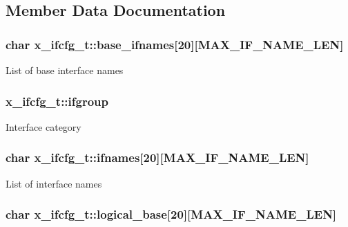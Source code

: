 \subsection{Member Data Documentation}
\hypertarget{structx__ifcfg__t_accff1ffe5db8d5f6d96b007b8bff2157}{
\subsubsection[{base\-\_\-ifnames}]{\setlength{\rightskip}{0pt plus 5cm}char x\-\_\-ifcfg\-\_\-t\-::base\-\_\-ifnames\mbox{[}20\mbox{]}\mbox{[}{\bf M\-A\-X\-\_\-\-I\-F\-\_\-\-N\-A\-M\-E\-\_\-\-L\-E\-N}\mbox{]}}}\label{structx__ifcfg__t_accff1ffe5db8d5f6d96b007b8bff2157}
List of base interface names \hypertarget{structx__ifcfg__t_a465fac74e7e1a3c4a255e7ad550c7fd2}{
\subsubsection[{ifgroup}]{ x\-\_\-ifcfg\-\_\-t\-::ifgroup}}\label{structx__ifcfg__t_a465fac74e7e1a3c4a255e7ad550c7fd2}
Interface category \hypertarget{structx__ifcfg__t_aac5a55bd377922f0fd0f56f6b0b4ab43}{
\subsubsection[{ifnames}]{\setlength{\rightskip}{0pt plus 5cm}char x\-\_\-ifcfg\-\_\-t\-::ifnames\mbox{[}20\mbox{]}\mbox{[}{\bf M\-A\-X\-\_\-\-I\-F\-\_\-\-N\-A\-M\-E\-\_\-\-L\-E\-N}\mbox{]}}}\label{structx__ifcfg__t_aac5a55bd377922f0fd0f56f6b0b4ab43}
List of interface names \hypertarget{structx__ifcfg__t_a09e6a73488b8c4dd93a4202fe11f954e}{
\subsubsection[{logical\-\_\-base}]{\setlength{\rightskip}{0pt plus 5cm}char x\-\_\-ifcfg\-\_\-t\-::logical\-\_\-base\mbox{[}20\mbox{]}\mbox{[}{\bf M\-A\-X\-\_\-\-I\-F\-\_\-\-N\-A\-M\-E\-\_\-\-L\-E\-N}\mbox{]}}}\label{structx__ifcfg__t_a09e6a73488b8c4dd93a4202fe11f954e}
